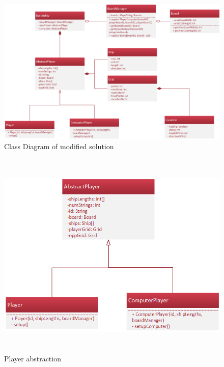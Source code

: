 \documentclass[11pt,slovak,a4paper,twoside]{article}
\begin{document}
\begin{figure}[t]  %
					\begin{center}
									\includegraphics[width=\linewidth]{fig/refactoredSchema.png}
									\caption{Class Diagram of modified solution}
									\label{refactoredSchema}
					\end{center}
\end{figure}


\begin{figure}[H]  %
					\begin{center}
									\includegraphics[height=10cm]{fig/playerAbstraction.png}
									\caption{Player abstraction}
									\label{playerAbstraction}
					\end{center}
\end{figure}
\end{document}
